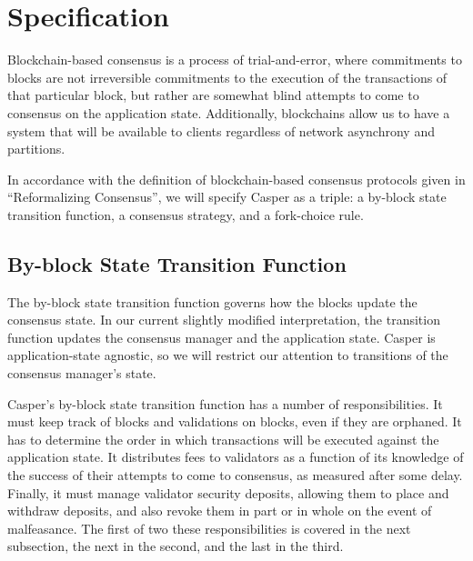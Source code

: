 \documentclass[11pt,a4paper]{article}
\begin{document}

\section{Specification}

Blockchain-based consensus is a process of trial-and-error, where commitments to blocks are not irreversible commitments to the execution of the transactions of that particular block, but rather are somewhat blind attempts to come to consensus on the application state. Additionally, blockchains allow us to have a system that will be available to clients regardless of network asynchrony and partitions.

In accordance with the definition of blockchain-based consensus protocols given in ``Reformalizing Consensus''\cite{ReformalizingConsensus}, we will specify Casper as a triple: a by-block state transition function, a consensus strategy, and a fork-choice rule.


\subsection{By-block State Transition Function}

The by-block state transition function governs how the blocks update the consensus state. In our current slightly modified interpretation, the transition function updates the consensus manager and the application state. Casper is application-state agnostic, so we will restrict our attention to transitions of the consensus manager's state. 

Casper's by-block state transition function has a number of responsibilities. It must keep track of blocks and validations on blocks, even if they are orphaned. It has to determine the order in which transactions will be executed against the application state. It distributes fees to validators as a function of its knowledge of the success of their attempts to come to consensus, as measured after some delay. Finally, it must manage validator security deposits, allowing them to place and withdraw deposits, and also revoke them in part or in whole on the event of malfeasance. The first of two these responsibilities is covered in the next subsection, the next in the second, and the last in the third.
\end{document}
